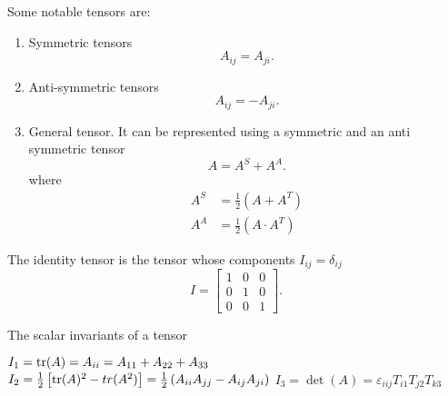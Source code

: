 \documentclass{report}
\begin{document}
Some notable tensors are:
\begin{enumerate}
	\item Symmetric tensors
	      \[
		      A_{ij} = A_{ji}
		      .\]
	\item Anti-symmetric tensors
	      \[
		      A_{ij} = -A_{ji}
		      .\]
	\item General tensor. It can be represented using a symmetric and an anti symmetric tensor
	      \[
		      A = A^S + A^A
		      .\]
	      where
	      \begin{align*}
		      A^S & = \frac{1}{2}(A+A^T)      \\
		      A^A & = \frac{1}{2}(A\cdot A^T)
	      \end{align*}
\end{enumerate}

The identity tensor is the tensor whose components $I_{ij} = \delta_{ij}$
\[
	I = \begin{bmatrix}
		1 & 0 & 0 \\
		0 & 1 & 0 \\
		0 & 0 & 1
	\end{bmatrix}
	.\]

The scalar invariants of a tensor
\begin{enumerate}
	\ii $I_1 = \operatorname{tr}(A) = A_{ii} = A_{11} + A_{22} + A_{33}$
	\ii $I_2 = \frac{1}{2} \left[\operatorname{tr}(A)^2 - tr(A^2)\right] = \frac{1}{2} \left(A_{ii}A_{jj} - A_{ij}A_{ji}\right)$
	\ii $I_3 = \det(A) = \varepsilon_{iij}T_{i1}T_{j2}T_{k3}$
\end{enumerate}
\end{document}
